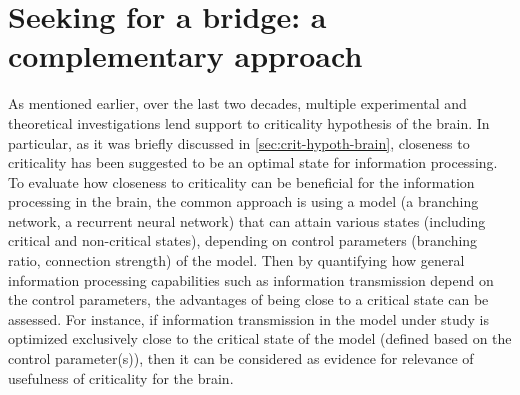 \section{Seeking for a bridge: a complementary approach}\label{sec:seek-bridg-compl}

As mentioned earlier, over the last two decades, multiple
experimental and theoretical investigations lend support to criticality hypothesis of the brain. 
In particular, as it was briefly discussed in \autoref{sec:crit-hypoth-brain},
closeness to criticality has been suggested to be an optimal state for information processing.
To evaluate how closeness to criticality can be beneficial for the information processing in the brain,
the common approach is using a model
(\eg a branching network, a recurrent neural network)
that can attain various states (including critical and non-critical states),
 depending on control parameters (\eg branching ratio, connection strength) of the model.
Then by quantifying how general information processing capabilities such as
information transmission
depend on the control parameters, the advantages of being close to a critical state can be assessed.
For instance, if information transmission in the model under study is optimized exclusively close to the critical state of the model (defined based on the control parameter(s)),
then it can be considered as evidence for relevance of usefulness of criticality for the brain.

